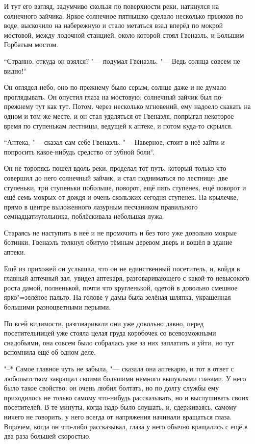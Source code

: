 И тут его взгляд, задумчиво скользя по поверхности реки, наткнулся на
солнечного зайчика.
Яркое солнечное пятнышко сделало несколько прыжков по воде, выскочило на
набережную и стало метаться взад вперёд по мокрой мостовой, между лодочной
станцией, около которой стоял Гвенаэль, и Большим Горбатым мостом.

\enquote{Странно, откуда он взялся? "--- подумал Гвенаэль.
"--- Ведь солнца совсем не видно!}

Он оглядел небо, оно по-прежнему было серым, солнце даже и не думало
проглядывать.
Он опустил глаза на мостовую: солнечный зайчик был по-прежнему тут как тут.
Потом, через несколько мгновений, ему надоело скакать на одном и том же месте,
и он стал удаляться от Гвенаэля, попрыгал некоторое время по ступенькам
лестницы, ведущей к аптеке, и потом куда-то скрылся.

\enquote{Аптека, "--- сказал сам себе Гвенаэль.
"--- Наверное, стоит в неё зайти и попросить какое-нибудь средство от зубной
боли}.

Он не торопясь пошёл вдоль реки, проделал тот путь, который только что совершил
до него солнечный зайчик, и стал подниматься по лестнице: две ступеньки, три
ступеньки побольше, поворот, ещё пять ступенек, ещё поворот и ещё семь мокрых
от дождя и очень скользких сегодня ступенек.
На крылечке, прямо в центре выложенного лазурным песчаником правильного
семнадцатиугольника, поблёскивала небольшая лужа.

Стараясь не наступить в неё и не промочить и без того уже довольно мокрые
ботинки, Гвенаэль толкнул обитую тёмным деревом дверь и вошёл в здание аптеки.

Ещё из прихожей он услышал, что он не единственный посетитель, и, войдя в
главный аптечный зал, увидел аптекаря, разговаривающего с какой-то невысокого
роста дамой, полненькой, почти что кругленькой, одетой в довольно смешное
ярко"=зелёное пальто.
На голове у дамы была зелёная шляпка, украшенная большими разноцветными перьями.

По всей видимости, разговаривали они уже довольно давно, перед посетительницей
уже стояла целая груда коробочек со всевозможными снадобьями, она совсем было
собралась уже за них заплатить и уйти, но тут вспомнила ещё об одном деле.

"--* Самое главное чуть не забыла, "--- сказала она аптекарю, и тот в ответ с
любопытством завращал своими большими немного выпуклыми глазами.
У него было такое свойство: он очень любил болтать, но по долгу службы ему
приходилось не только самому что-нибудь рассказывать, но и выслушивать своих
посетителей.
В те минуты, когда надо было слушать, и, сдерживаясь, самому ничего не
говорить, у него всегда от напряжения начинали вращаться глаза.
Впрочем, когда он что-либо рассказывал, глаза у него обычно вращались с ещё в
два раза большей скоростью.

